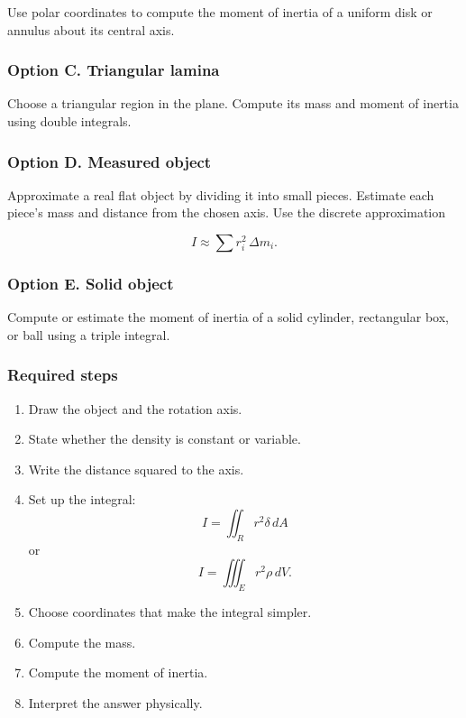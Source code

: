 Use polar coordinates to compute the moment of inertia of a uniform disk or annulus
about its central axis.

\subsubsection*{Option C. Triangular lamina}

Choose a triangular region in the plane.  Compute its mass and moment of inertia using
double integrals.

\subsubsection*{Option D. Measured object}

Approximate a real flat object by dividing it into small pieces.  Estimate each piece's
mass and distance from the chosen axis.  Use the discrete approximation

\[
    I\approx \sum r_i^2\,\Delta m_i.
\]

\subsubsection*{Option E. Solid object}

Compute or estimate the moment of inertia of a solid cylinder, rectangular box, or ball
using a triple integral.

\subsubsection*{Required steps}

\begin{enumerate}
\item Draw the object and the rotation axis.

\item State whether the density is constant or variable.

\item Write the distance squared to the axis.

\item Set up the integral:
\[
    I=\iint_R r^2\delta\,dA
\]
or
\[
    I=\iiint_E r^2\rho\,dV.
\]

\item Choose coordinates that make the integral simpler.

\item Compute the mass.

\item Compute the moment of inertia.

\item Interpret the answer physically.
\end{enumerate}

